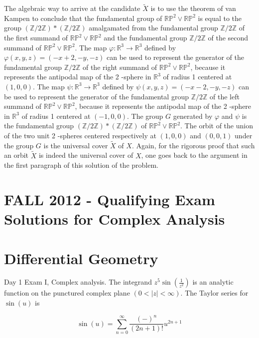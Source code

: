 \documentclass[10pt]{article}
\begin{document}
The algebraic way to arrive at the candidate $\tilde{X}$ is to use the theorem of van Kampen to conclude that the fundamental group of $\mathbb{R P}^{2} \vee \mathbb{R P}^{2}$ is equal to the group $(\mathbb{Z} / 2 \mathbb{Z}) *(\mathbb{Z} / 2 \mathbb{Z})$ amalgamated from the fundamental group $\mathbb{Z} / 2 \mathbb{Z}$ of the first summand of $\mathbb{R P}^{2} \vee \mathbb{R} \mathbb{P}^{2}$ and the fundamental group $\mathbb{Z} / 2 \mathbb{Z}$ of the second summand of $\mathbb{R} \mathbb{P}^{2} \vee \mathbb{R P}^{2}$. The map $\varphi: \mathbb{R}^{3} \rightarrow \mathbb{R}^{3}$ defined by $\varphi(x, y, z)=(-x+2,-y,-z)$ can be used to represent the generator of the fundamental group $\mathbb{Z} / 2 \mathbb{Z}$ of the right summand of $\mathbb{R P}^{2} \vee \mathbb{R P}^{2}$, because it represents the antipodal map of the 2 -sphere in $\mathbb{R}^{3}$ of radius 1 centered at $(1,0,0)$. The map $\psi: \mathbb{R}^{3} \rightarrow \mathbb{R}^{3}$ defined by $\psi(x, y, z)=(-x-2,-y,-z)$ can be used to represent the generator of the fundamental group $\mathbb{Z} / 2 \mathbb{Z}$ of the left summand of $\mathbb{R P}^{2} \vee \mathbb{R P}^{2}$, because it represents the antipodal map of the 2 -sphere in $\mathbb{R}^{3}$ of radius 1 centered at $(-1,0,0)$. The group $G$ generated by $\varphi$ and $\psi$ is the fundamental group $(\mathbb{Z} / 2 \mathbb{Z}) *(\mathbb{Z} / 2 \mathbb{Z})$ of $\mathbb{R P}^{2} \vee \mathbb{R P}^{2}$. The orbit of the union of the two unit 2 -spheres centered respectively at $(1,0,0)$ and $(0,0,1)$ under the group $G$ is the universal cover $\tilde{X}$ of $X$. Again, for the rigorous proof that such an orbit $\tilde{X}$ is indeed the universal cover of $X$, one goes back to the argument in the first paragraph of this solution of the problem.

\section{FALL 2012 - Qualifying Exam Solutions for Complex Analysis}
\section{Differential Geometry}
Day 1 Exam I, Complex analysis. The integrand $z^{5} \sin \left(\frac{1}{z^{2}}\right)$ is an analytic function on the punctured complex plane $(0<|z|<\infty)$. The Taylor series for $\sin (u)$ is

$$
\sin (u)=\sum_{n=0}^{\infty} \frac{(-)^{n}}{(2 n+1) !} u^{2 n+1}
$$
\end{document}
